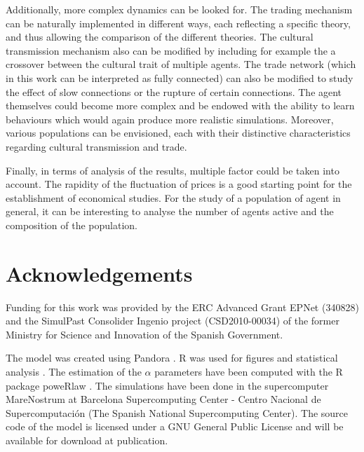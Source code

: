 \documentclass{wscpaperproc}
\begin{document}
Additionally, more complex dynamics can be looked for. The trading mechanism can be naturally implemented in different ways, each reflecting a specific theory, and thus allowing the comparison of the different theories. The cultural transmission mechanism also can be modified by including for example the a crossover between the cultural trait of multiple agents. The trade network (which in this work can be interpreted as fully connected) can also be modified to study the effect of slow connections or the rupture of certain connections. The agent themselves could become more complex and be endowed with the ability to learn behaviours which would again produce more realistic simulations. Moreover, various populations can be envisioned, each with their distinctive characteristics regarding cultural transmission and trade. 

Finally, in terms of analysis of the results, multiple factor could be taken into account. The rapidity of the fluctuation of prices is a good starting point for the establishment of economical studies. For the study of a population of agent in general, it can be interesting to analyse the number of agents active and the composition of the population.

\section{Acknowledgements}

Funding for this work was provided by the ERC Advanced Grant EPNet (340828) and the SimulPast Consolider Ingenio project (CSD2010-00034) of the former Ministry for Science and Innovation of the Spanish Government. 

The model was created using Pandora \cite{rubiocampillo_2014}. R was used for figures and statistical analysis \cite{rdev_2012}. The estimation of the $\alpha$ parameters have been computed with the R package poweRlaw \cite{gillespie_fitting_2015}. The simulations have been done in the supercomputer MareNostrum at Barcelona Supercomputing Center - Centro Nacional de Supercomputación (The Spanish National Supercomputing Center). The source code of the model is licensed under a GNU General Public License and will be available for download at publication.


  
\end{document}
